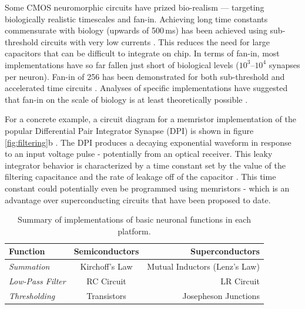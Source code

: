 \documentclass[twocolumn]{article}
\begin{document}
Some CMOS neuromorphic circuits have prized bio-realism --- targeting biologically realistic timescales and fan-in. Achieving long time constants commensurate with biology (upwards of 500\,ms) has been achieved using sub-threshold circuits with very low currents \cite{indiveri2011neuromorphic}.  This reduces the need for large capacitors that can be difficult to integrate on chip. In terms of fan-in, most implementations have so far fallen just short of biological levels ($10^3$--$10^4$ synapses per neuron). Fan-in of 256 has been demonstrated for both sub-threshold \cite{qiao2015reconfigurable} and accelerated time circuits \cite{schemmel2020accelerated}. Analyses of specific implementations have suggested that fan-in on the scale of biology is at least theoretically possible \cite{dowrick2018fan, akima2014majority}.  

For a concrete example, a circuit diagram for a memristor implementation of the popular Differential Pair Integrator Synapse (DPI) is shown in figure \ref{fig:filtering}b \cite{dalgaty2019hybrid}. The DPI produces a decaying exponential waveform in response to an input voltage pulse - potentially from an optical receiver. This leaky integrator behavior is characterized by a time constant set by the value of the filtering capacitance and the rate of leakage off of the capacitor \cite{chicca2014neuromorphic}. This time constant could potentially even be programmed using memristors - which is an advantage over superconducting circuits that have been proposed to date.

\begin{table}[h]
  \begin{center}
    \label{tab:mathtable}
    \begin{tabular}{l|c|r} %
      \textbf{Function} & \textbf{Semiconductors} & \textbf{Superconductors}\\
      \hline
      \textit{Summation} & Kirchoff's Law & Mutual Inductors (Lenz's Law)\\
      \textit{Low-Pass Filter} & RC Circuit & LR Circuit\\
      \textit{Thresholding} & Transistors & Josepheson Junctions\\
    \end{tabular}
    \caption{Summary of implementations of basic neuronal functions in each platform.}
  \end{center}
\end{table}
\end{document}
